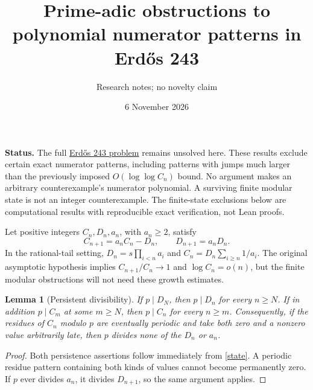 \documentclass[11pt]{article}
\title{Prime-adic obstructions to polynomial numerator patterns in Erd\H{o}s 243}
\author{Research notes; no novelty claim}
\date{6 November 2026}
\newtheorem{lemma}{Lemma}
\begin{document}
\maketitle

\noindent\textbf{Status.} The full
\href{https://conjectures.io/problems/erdos243-erdos-243}{Erd\H{o}s 243 problem}
remains unsolved here. These results exclude certain exact numerator patterns,
including patterns with jumps much larger than the previously imposed
$O(\log\log C_n)$ bound. No argument makes an arbitrary counterexample's
numerator polynomial. A surviving finite modular state is not an integer
counterexample. The finite-state exclusions below are computational results
with reproducible exact verification, not Lean proofs.

Let positive integers $C_n,D_n,a_n$, with $a_n\ge2$, satisfy
\begin{equation}\label{state}
 C_{n+1}=a_nC_n-D_n,\qquad D_{n+1}=a_nD_n.
\end{equation}
In the rational-tail setting, $D_n=s\prod_{i<n}a_i$ and
$C_n=D_n\sum_{i\ge n}1/a_i$. The original asymptotic hypothesis implies
$C_{n+1}/C_n\to1$ and $\log C_n=o(n)$, but the finite modular obstructions
will not need these growth estimates.

\begin{lemma}[Persistent divisibility]\label{persistent}
If $p\mid D_N$, then $p\mid D_n$ for every $n\ge N$. If in addition
$p\mid C_m$ at some $m\ge N$, then $p\mid C_n$ for every $n\ge m$.
Consequently, if the residues of $C_n$ modulo $p$ are eventually periodic
and take both zero and a nonzero value arbitrarily late, then $p$ divides
none of the $D_n$ or $a_n$.
\end{lemma}
\begin{proof}
Both persistence assertions follow immediately from \eqref{state}.
A periodic residue pattern containing both kinds of values cannot become
permanently zero. If $p$ ever divides $a_n$, it divides $D_{n+1}$, so the
same argument applies.
\end{proof}
\end{document}

